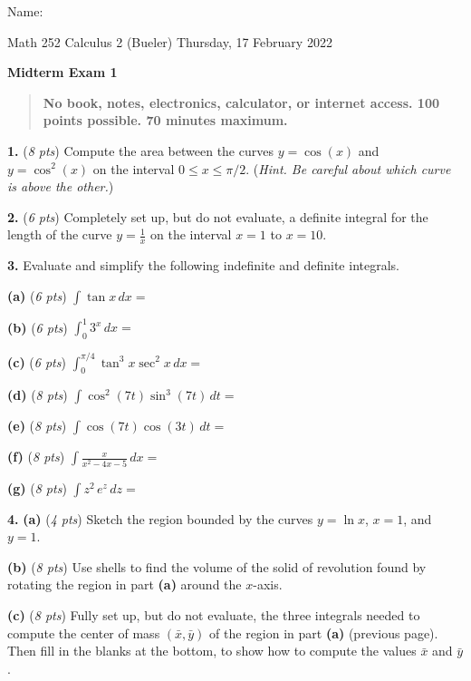 \documentclass[11pt]{amsart}
\newcommand{\ds}{\displaystyle}
\newcommand{\prob}[1]{\bigskip\noindent\textbf{#1.} }
\newcommand{\pts}[1]{(\emph{#1 pts})}
\newcommand{\probpts}[2]{\prob{#1} \pts{#2} \quad}
\newcommand{\ppartpts}[2]{\textbf{(#1)} \pts{#2} \quad}
\newcommand{\epartpts}[2]{\medskip\noindent \textbf{(#1)} \pts{#2} \quad}
\begin{document}
\hfill \Large Name:\underline{\phantom{Ed Bueler really really long long long name}}
\medskip

\scriptsize \noindent Math 252 Calculus 2 (Bueler) \hfill Thursday, 17 February 2022
\medskip

\LARGE\centerline{\textbf{Midterm Exam 1}}

\smallskip
\begin{quote}
\large
\textbf{No book, notes, electronics, calculator, or internet access.  100 points possible. 70 minutes maximum.}
\end{quote}

\normalsize
\medskip

\thispagestyle{empty}

\probpts{1}{8}  Compute the area between the curves $y=\cos(x)$ and $y=\cos^2(x)$ on the interval $0\le x \le \pi/2$. \quad (\emph{Hint.  Be careful about which curve is above the other.})
\vfill

\probpts{2}{6}  Completely set up, but do not evaluate, a definite integral for the length of the curve $\ds y=\frac{1}{x}$ on the interval $x=1$ to $x=10$.
\vspace{2.5in}

\clearpage\newpage
\prob{3}  Evaluate and simplify the following indefinite and definite integrals.

\epartpts{a}{6}  $\ds \int \tan x\,dx = $
\vfill

\epartpts{b}{6}  $\ds \int_0^1 3^x\,dx = $
\vfill

\epartpts{c}{6}  $\ds \int_0^{\pi/4} \tan^3 x \sec^2 x\,dx = $
\vfill

\clearpage\newpage
\epartpts{d}{8}  $\ds \int \cos^2 (7t) \sin^3 (7t) \,dt = $
\vfill

\epartpts{e}{8}  $\ds \int \cos(7t) \cos(3t)\,dt = $
\vfill

\clearpage\newpage
\epartpts{f}{8}  $\ds \int \frac{x}{x^2-4x - 5}\,dx = $
\vfill

\epartpts{g}{8}  {\large $\ds \int z^2\, e^z\,dz = $}
\vfill

\clearpage\newpage
\prob{4}  \ppartpts{a}{4} Sketch the region bounded by the curves $y=\ln x$, $x=1$, and $y=1$.
\vspace{3.0in}

\epartpts{b}{8}  Use shells to find the volume of the solid of revolution found by rotating the region in part \textbf{(a)} around the $x$-axis.
\vfill

\clearpage\newpage
\epartpts{c}{8}  Fully set up, but do not evaluate, the three integrals needed to compute the center of mass $(\bar x,\bar y)$ of the region in part \textbf{(a)} (previous page).  Then fill in the blanks at the bottom, to show how to compute the values $\bar x$ and $\bar y$.
\vfill
\end{document}

